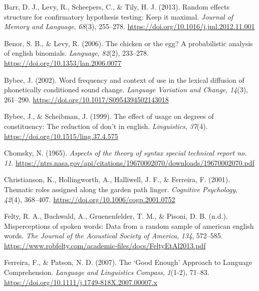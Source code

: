 \documentclass[
  12pt,
]{scrartcl}
\newlength{\cslhangindent}
\newenvironment{CSLReferences}[2] %
 {\begin{list}{}{%
  \setlength{\itemindent}{0pt}
  \setlength{\leftmargin}{0pt}
  \setlength{\parsep}{0pt}
  \ifodd #1
   \setlength{\leftmargin}{\cslhangindent}
   \setlength{\itemindent}{-1\cslhangindent}
  \fi
  \setlength{\itemsep}{#2\baselineskip}}}
 {\end{list}}
\begin{document}
\label{refs}
\begin{CSLReferences}{1}{0}
Barr, D. J., Levy, R., Scheepers, C., \& Tily, H. J. (2013). Random
effects structure for confirmatory hypothesis testing: Keep it maximal.
\emph{Journal of Memory and Language}, \emph{68}(3), 255--278.
\url{https://doi.org/10.1016/j.jml.2012.11.001}

Benor, S. B., \& Levy, R. (2006). The chicken or the egg? A
probabilistic analysis of english binomials. \emph{Language},
\emph{82}(2), 233--278. \url{https://doi.org/10.1353/lan.2006.0077}

Bybee, J. (2002). Word frequency and context of use in the lexical
diffusion of phonetically conditioned sound change. \emph{Language
Variation and Change}, \emph{14}(3), 261--290.
\url{https://doi.org/10.1017/S0954394502143018}

Bybee, J., \& Scheibman, J. (1999). The effect of usage on degrees of
constituency: The reduction of don't in english. \emph{Linguistics},
\emph{37}(4). \url{https://doi.org/10.1515/ling.37.4.575}

Chomsky, N. (1965). \emph{Aspects of the theory of syntax special
technical report no. 11}.
\url{https://ntrs.nasa.gov/api/citations/19670002070/downloads/19670002070.pdf}

Christianson, K., Hollingworth, A., Halliwell, J. F., \& Ferreira, F.
(2001). Thematic roles assigned along the garden path linger.
\emph{Cognitive Psychology}, \emph{42}(4), 368--407.
\url{https://doi.org/10.1006/cogp.2001.0752}

Felty, R. A., Buchwald, A., Gruenenfelder, T. M., \& Pisoni, D. B.
(n.d.). Misperceptions of spoken words: Data from a random sample of
american english words. \emph{The Journal of the Acoustical Society of
America}, \emph{134}, 572--585.
\url{https://www.robfelty.com/academic-files/docs/FeltyEtAl2013.pdf}

Ferreira, F., \& Patson, N. D. (2007). The {`}Good Enough{'} Approach to
Language Comprehension. \emph{Language and Linguistics Compass},
\emph{1}(1-2), 71--83.
\url{https://doi.org/10.1111/j.1749-818X.2007.00007.x}


\end{CSLReferences}
\end{document}
